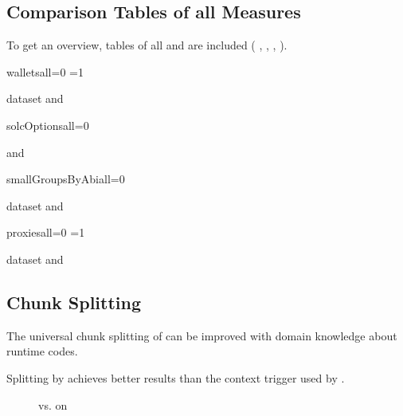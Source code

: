 \documentclass[../main.tex]{subfiles}
\begin{document}
\subsection{Comparison Tables of all Measures}

To get an overview, tables of all  and  are included ( , \n{\solcts} ,  ,  ).

\begin{sepTbl}{wallets}{all}{=0 \or {}=1}
  \caption{ dataset  and }
  \label{tbl:wallet_sep}
\end{sepTbl}

\begin{sepTbl}{solcOptions}{all}{=0}
  \caption{\n{\solcts}  and }
  \label{tbl:solc_sep}
\end{sepTbl}

\begin{sepTbl}{smallGroupsByAbi}{all}{=0}
  \caption{ dataset  and }
  \label{tbl:smallGroupsByAbi}
\end{sepTbl}

\begin{sepTbl}{proxies}{all}{=0 \or {}=1}
  \caption{ dataset  and }
  \label{tbl:proxies_sep}
\end{sepTbl}

\subsection{Chunk Splitting}
\begin{hyp}
  The universal chunk splitting of  can be improved with domain knowledge about  runtime codes.
\end{hyp}
\begin{res}
  Splitting by  achieves better results than the context trigger used by   .
\end{res}

\begin{figure}[ht!]
  \centering
  \caption{ vs.  on }
  \label{fig:walletsJumpPpHist}
\end{figure}
\end{document}
